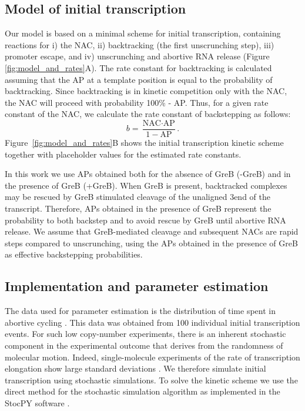 %
\subsection{Model of initial transcription}
Our model is based on a minimal scheme for initial transcription, containing
reactions for i) the NAC, ii) backtracking (the
first unscrunching step), iii) promoter escape, and iv) unscrunching and
abortive RNA release (Figure \ref{fig:model_and_rates}A). The rate constant
for backtracking is calculated assuming that the AP at a template position is
equal to the probability of backtracking. Since backtracking is in kinetic
competition only with the NAC, the NAC will proceed with probability 100\% -
AP. Thus, for a given rate constant of the NAC, we calculate the rate
constant of backstepping as follows:
\begin{equation}
  b = \frac{\text{NAC}\cdot\text{AP}}{1-\text{AP}}.
  \label{fig:backtrackingcalc}
\end{equation}
Figure~\ref{fig:model_and_rates}B shows the initial transcription kinetic
scheme together with placeholder values for the estimated rate constants.

In this work we use APs obtained both for the absence of GreB (-GreB) and in
the presence of GreB (+GreB). When GreB is present, backtracked complexes may
be rescued by GreB stimulated cleavage of the unaligned 3\ppp end of the
transcript. Therefore, APs obtained in the presence of GreB represent the
probability to both backstep and to avoid rescue by GreB until abortive RNA
release. We assume that GreB-mediated cleavage and subsequent NACs are rapid
steps compared to unscrunching, using the APs obtained in the presence of GreB
as effective backstepping probabilities.

\subsection{Implementation and parameter estimation}
The data used for parameter estimation is the distribution of time spent in
abortive cycling \cite{revyakin_abortive_2006}. This data was obtained from
100 individual initial transcription events. For such low copy-number
experiments, there is an inherent stochastic component in the experimental
outcome that derives from the randomness of molecular motion. Indeed,
single-molecule experiments of the rate of transcription elongation show large
standard deviations \cite{adelman_single_2002,
tolic-norrelykke_diversity_2004}. We therefore simulate initial transcription
using stochastic simulations. To solve the kinetic scheme we use the direct
method for the stochastic simulation algorithm \cite{gillespie_exact_1977} as
implemented in the StocPY software \cite{maarleveld_stochpy:_2013}. 

